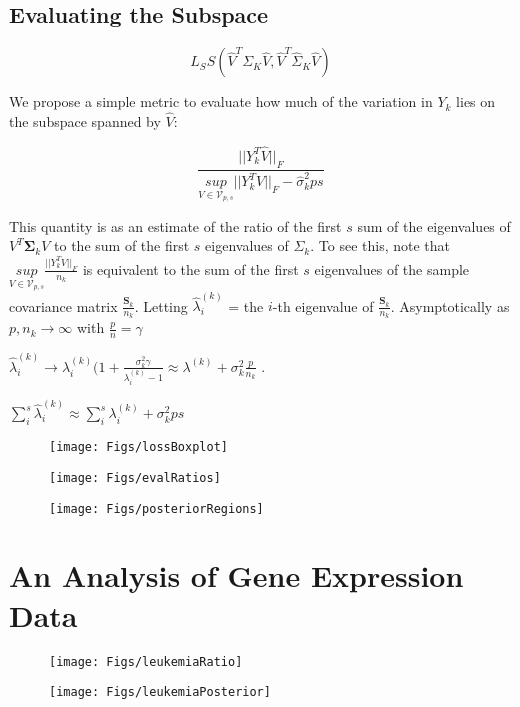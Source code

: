 \documentclass{article}
\newcommand{\bl}[1]{{\mathbf #1}}
\begin{document}


\subsection{Evaluating the Subspace}


$$L_SS(\hat{V}^T\Sigma_K\hat{V} , \hat{V}^T\hat{\Sigma}_K\hat{V}) $$

We propose a simple metric  to evaluate how much of the variation in $Y_k$ lies on the
subspace spanned by $\hat{V}$:

$$ \frac{||Y_k^T\hat{V}||_F}{\underset{V \in \mathcal{V}_{p, s}}{sup}
  ||Y_k^TV||_F - \hat{\sigma}_k^2ps}$$

This quantity is  as an estimate of the ratio of the first $s$
sum of the eigenvalues of $V^T\bl \Sigma_k V$ to the sum of the first
$s$ eigenvalues of $\Sigma_k$.  To see this, note that $\underset{V \in \mathcal{V}_{p, s}}{sup}\frac{||Y_k^TV||_F}{n_k}$
is equivalent to the sum of the first $s$ eigenvalues of the sample
covariance matrix $\frac{\bl S_k}{n_k}$.  Letting
$\hat{\lambda}^{(k)}_i$ = the $i$-th eigenvalue of $\frac{\bl S_k}{n_k}$.  Asymptotically as $p, n_k \rightarrow \infty$ with
$\frac{p}{n} = \gamma$

$ \hat{\lambda}^{(k)}_i\rightarrow \lambda^{(k)}_i
(1 + \frac{\sigma_k^2\gamma}{\lambda^{(k)}_i - 1} \approx \lambda^{(k)}
+ \sigma^2_k\frac{p}{n_k}$ \citep{Baik2006}.

$\sum_i^s \hat{\lambda}^{(k)}_i \approx \sum_i^s \lambda^{(k)}_i + \sigma_k^2ps$


\begin{figure}[!ht]
  \centering
    \texttt{[image: Figs/lossBoxplot]}
  \caption{}
\end{figure}

\begin{figure}[!ht]
  \centering
    \texttt{[image: Figs/evalRatios]}
  \caption{}
\label{fig:evalRatios}
\end{figure}

\begin{figure}[!ht]
  \centering
    \texttt{[image: Figs/posteriorRegions]}
  \caption{}
\label{fig:posteriorRegions}
\end{figure}

\section{An Analysis of Gene Expression Data}

\begin{figure}[!ht]
  \centering
    \texttt{[image: Figs/leukemiaRatio]}
  \caption{}
\label{fig:leukemiaRatio}
\end{figure}

\begin{figure}[!ht]
  \centering
    \texttt{[image: Figs/leukemiaPosterior]}
  \caption{}
\label{fig:leukemiaRatio}
\end{figure}




\end{document}
